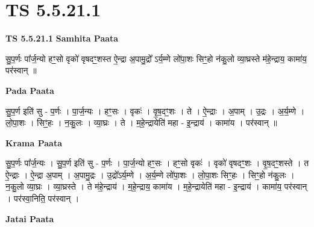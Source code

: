 \documentclass[17pt]{extarticle}
\begin{document}
\section{ TS 5.5.21.1 }

\textbf{TS 5.5.21.1 } \newline
\textbf{Samhita Paata} \newline

सु॒प॒र्णः पा᳚र्ज॒न्यो हꣳ॒॒सो वृको॑ वृषदꣳ॒॒शस्त ऐ॒न्द्रा अ॒पामु॒द्रो᳚ ऽर्य॒म्णे लो॑पा॒शः सिꣳ॒॒हो न॑कु॒लो व्या॒घ्रस्ते म॑हे॒न्द्राय॒ कामा॑य॒ पर॑स्वान् ॥ \newline

\textbf{Pada Paata} \newline

सु॒प॒र्ण इति॑ सु - प॒र्णः । पा॒र्ज॒न्यः । हꣳ॒॒सः । वृकः॑ । वृ॒ष॒दꣳ॒॒शः । ते । ऐ॒न्द्राः । अ॒पाम् । उ॒द्रः । अ॒र्य॒म्णे । लो॒पा॒शः । सिꣳ॒॒हः । न॒कु॒लः । व्या॒घ्रः । ते । म॒हे॒न्द्रायेति॑ महा - इ॒न्द्राय॑ । कामा॑य । पर॑स्वान् ॥  \newline


\textbf{Krama Paata} \newline

सु॒प॒र्णः पा᳚र्ज॒न्यः । सु॒प॒र्ण इति॑ सु - प॒र्णः । पा॒र्ज॒न्यो हꣳ॒॒सः । हꣳ॒॒सो वृकः॑ । वृको॑ वृषदꣳ॒॒शः । वृ॒ष॒दꣳ॒॒शस्ते । त ऐ॒न्द्राः । ऐ॒न्द्रा अ॒पाम् । अ॒पामु॒द्रः । उ॒द्रो᳚ऽर्य॒म्णे । अ॒र्य॒म्णे लो॑पा॒शः । लो॒पा॒शः सिꣳ॒॒हः । सिꣳ॒॒हो न॑कु॒लः । न॒कु॒लो व्या॒घ्रः । व्या॒घ्रस्ते । ते म॑हे॒न्द्राय॑ । म॒हे॒न्द्राय॒ कामा॑य । म॒हे॒न्द्रायेति॑ महा - इ॒न्द्राय॑ । कामा॑य॒ पर॑स्वान् । पर॑स्वा॒निति॒ पर॑स्वान् । \newline

\textbf{Jatai Paata} \newline
\end{document}
